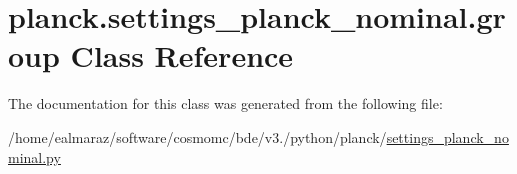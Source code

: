 \hypertarget{classplanck_1_1settings__planck__nominal_1_1group}{}\section{planck.\+settings\+\_\+planck\+\_\+nominal.\+group Class Reference}
\label{classplanck_1_1settings__planck__nominal_1_1group}


The documentation for this class was generated from the following file\+:\begin{DoxyCompactItemize}
\item 
/home/ealmaraz/software/cosmomc/bde/v3./python/planck/\mbox{\hyperlink{settings__planck__nominal_8py}{settings\+\_\+planck\+\_\+nominal.\+py}}\end{DoxyCompactItemize}

